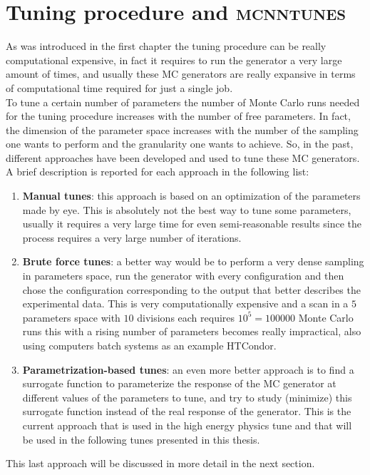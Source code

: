 \chapter{Tuning procedure and \textsc{mcnntunes}}
\label{chap:TuneprocedureCP5TuneandMCNNTUNES}


As was introduced in the first chapter the tuning procedure can be really computational expensive, in fact it requires to run the generator a very large amount of times, and usually these MC generators are really expansive in terms of computational time required for just a single job.  
\\
To tune a certain number of parameters the number of Monte Carlo runs needed for the tuning procedure increases with the number of free parameters. In fact, the dimension of the parameter space increases with the number of the sampling one wants to perform and the granularity one wants to achieve. So, in the past, different approaches have been developed and used to tune these MC generators. A brief description is reported for each approach in the following list:
\begin{enumerate}[label=\arabic*)]
	\item \textbf{Manual tunes}: this approach is based on an optimization of the parameters made by eye. This is absolutely not the best way to tune some parameters, usually it requires a very large time for even semi-reasonable results since the process requires a very large number of iterations.   
	\item \textbf{Brute force tunes}: a better way would be to perform a very dense sampling in parameters space, run the generator with every configuration and then chose the configuration corresponding to the output that better describes the experimental data. This is very computationally expensive and a scan in a $5$ parameters space with $10$ divisions each requires $10^5=100000$ Monte Carlo runs this with a rising number of parameters becomes really impractical, also using computers batch systems as an example HTCondor.   
	\item \textbf{Parametrization-based tunes}: an even more better approach is to find a surrogate function to parameterize the response of the MC generator at different values of the parameters to tune, and try to study (minimize) this surrogate function instead of the real response of the generator. This is the current approach that is used in the high energy physics tune and that will be used in the following tunes presented in this thesis.
\end{enumerate}
This last approach will be discussed in more detail in the next section.

